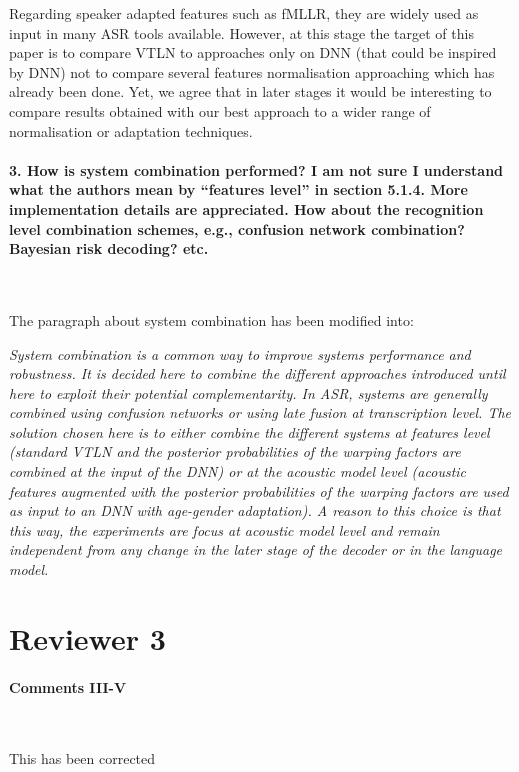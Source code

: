 \documentclass[]{article}
\begin{document}
Regarding speaker adapted features such as fMLLR, they are widely used as input in many ASR tools available. However, at this stage the target of this paper is to compare VTLN to approaches only on DNN (that could be inspired by DNN) not to compare several features normalisation approaching which has already been done. Yet, we agree that in later stages it would be interesting to compare results obtained with our best approach to a wider range of normalisation or adaptation techniques.

\paragraph{3. How is system combination performed? I am not sure I understand what the authors mean by “features level” in section 5.1.4. More implementation details are appreciated. How about the recognition level combination schemes, e.g., confusion network combination? Bayesian risk decoding? etc.}

~

The paragraph about system combination has been modified into:

\textit{System combination is a common way to improve systems performance and robustness. It is decided here to combine the different approaches introduced until here to exploit their potential complementarity. In ASR, systems are generally combined using confusion networks or using late fusion at transcription level. The solution chosen here is to either combine the different systems at features level (standard VTLN and the posterior probabilities of the warping factors are combined at the input of the DNN) or at the acoustic model level (acoustic features augmented with the posterior probabilities of the warping factors are used as input to an DNN with age-gender adaptation). A reason to this choice is that this way, the experiments are focus at acoustic model level and remain independent from any change in the later stage of the decoder or in the language model.}

\section{Reviewer 3}

\paragraph{Comments III-V}

~

This has been corrected
\end{document}

